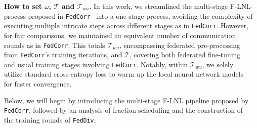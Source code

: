 \documentclass[letterpaper]{article} %
\begin{document}
\noindent
\textbf{How to set $\omega$, $\mathcal{T}$ and $\mathcal{T}_{wu}$.}
In this work, we streamlined the multi-stage F-LNL process proposed in \texttt{FedCorr}~\cite{xu2022fedcorr} into a one-stage process, avoiding the complexity of executing multiple intricate steps across different stages as in \texttt{FedCorr}. However, for fair comparisons, we maintained an equivalent number of communication rounds as in \texttt{FedCorr}. This totals $\mathcal{T}_{wu}$, encompassing federated pre-processing from \texttt{FedCorr}'s training iterations, and $\mathcal{T}$, covering both federated fine-tuning and usual training stages involving \texttt{FedCorr}. Notably, within $\mathcal{T}_{wu}$, we solely utilize standard cross-entropy loss to warm up the local neural network models for faster convergence.

Below, we will begin by introducing the multi-stage F-LNL pipeline proposed by \texttt{FedCorr}, followed by an analysis of fraction scheduling and the construction of the training rounds of \texttt{FedDiv}.
\end{document}
